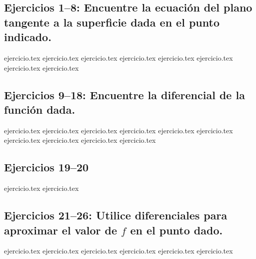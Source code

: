 
\subsection*{Ejercicios 1--8: Encuentre la ecuación del plano tangente a la superficie dada en el punto indicado.}
\begin{enumerate}
    {ejercicio.tex}
    {ejercicio.tex}
    {ejercicio.tex}
    {ejercicio.tex}
    {ejercicio.tex}
    {ejercicio.tex}
    {ejercicio.tex}
    {ejercicio.tex}
\end{enumerate}

\subsection*{Ejercicios 9--18: Encuentre la diferencial de la función dada.}
\begin{enumerate}
    \setcounter{enumi}{8}
    {ejercicio.tex}
    {ejercicio.tex}
    {ejercicio.tex}
    {ejercicio.tex}
    {ejercicio.tex}
    {ejercicio.tex}
    {ejercicio.tex}
    {ejercicio.tex}
    {ejercicio.tex}
    {ejercicio.tex}
\end{enumerate}

\subsection*{Ejercicios 19--20}
\begin{enumerate}
    \setcounter{enumi}{18}
    {ejercicio.tex}
    {ejercicio.tex}
\end{enumerate}

\subsection*{Ejercicios 21--26: Utilice diferenciales para aproximar el valor de $f$ en el punto dado.}
\begin{enumerate}
    \setcounter{enumi}{20}
    {ejercicio.tex}
    {ejercicio.tex}
    {ejercicio.tex}
    {ejercicio.tex}
    {ejercicio.tex}
    {ejercicio.tex}
\end{enumerate}

